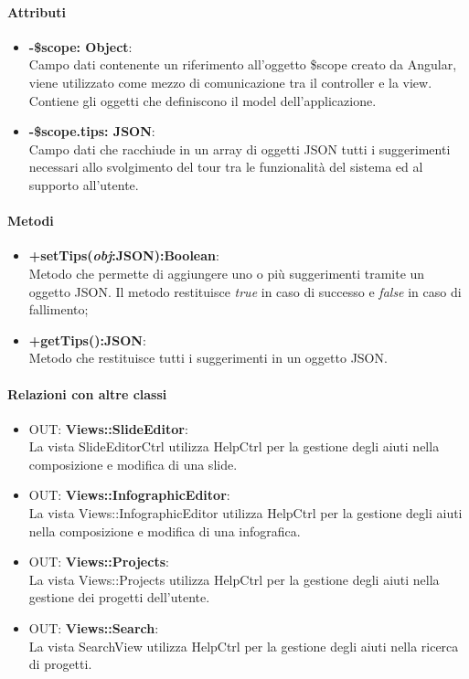 	\paragraph{Attributi}
	\begin{itemize}
		\item \textbf{-\$scope: Object}:\\
				Campo dati contenente un riferimento all'oggetto \$scope creato da Angular, viene utilizzato come mezzo di comunicazione tra il controller e la view. Contiene gli oggetti che definiscono il model dell'applicazione.
		\item \textbf{-\$scope.tips: JSON}:\\
				Campo dati che racchiude in un array di oggetti JSON tutti i suggerimenti necessari allo svolgimento del tour tra le funzionalità del sistema ed al supporto all'utente. 
	\end{itemize}
	
	\paragraph{Metodi}
	\begin{itemize}
	  \item \textbf{+setTips(\textit{obj}:JSON):Boolean}:\\
		  Metodo che permette di aggiungere uno o più suggerimenti tramite un oggetto JSON. Il metodo restituisce \textit{true} in caso di successo e \textit{false} in caso di fallimento;
	  \item \textbf{+getTips():JSON}:\\
		  Metodo che restituisce tutti i suggerimenti in un oggetto JSON.
	\end{itemize}
	\paragraph{Relazioni con altre classi}
	\begin{itemize}
	 \item OUT: \textbf{Views::SlideEditor}:\\
		La vista SlideEditorCtrl utilizza HelpCtrl per la gestione degli aiuti nella composizione e modifica di una slide.
	 \item OUT: \textbf{Views::InfographicEditor}:\\
		La vista Views::InfographicEditor utilizza HelpCtrl per la gestione degli aiuti nella composizione e modifica di una infografica.
	 \item OUT: \textbf{Views::Projects}:\\
		La vista Views::Projects utilizza HelpCtrl per la gestione degli aiuti nella gestione dei progetti dell'utente.
	 \item OUT: \textbf{Views::Search}:\\
		La vista SearchView utilizza HelpCtrl per la gestione degli aiuti nella ricerca di progetti.
	\end{itemize}

